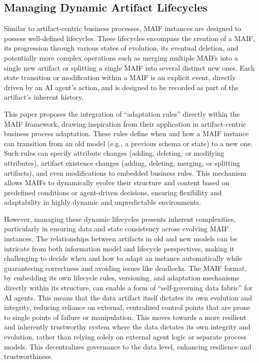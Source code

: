 \documentclass[conference]{IEEEtran}
\begin{document}
\subsection{Managing Dynamic Artifact Lifecycles}

Similar to artifact-centric business processes, MAIF instances are designed to possess well-defined lifecycles. These lifecycles encompass the creation of a MAIF, its progression through various states of evolution, its eventual deletion, and potentially more complex operations such as merging multiple MAIFs into a single new artifact or splitting a single MAIF into several distinct new ones\cite{ref12}. Each state transition or modification within a MAIF is an explicit event, directly driven by an AI agent's action, and is designed to be recorded as part of the artifact's inherent history.

This paper proposes the integration of ``adaptation rules'' directly within the MAIF framework, drawing inspiration from their application in artifact-centric business process adaptation\cite{ref12}. These rules define when and how a MAIF instance can transition from an old model (e.g., a previous schema or state) to a new one. Such rules can specify attribute changes (adding, deleting, or modifying attributes), artifact existence changes (adding, deleting, merging, or splitting artifacts), and even modifications to embedded business rules\cite{ref12}. This mechanism allows MAIFs to dynamically evolve their structure and content based on predefined conditions or agent-driven decisions, ensuring flexibility and adaptability in highly dynamic and unpredictable environments.

However, managing these dynamic lifecycles presents inherent complexities, particularly in ensuring data and state consistency across evolving MAIF instances\cite{ref12}. The relationships between artifacts in old and new models can be intricate from both information model and lifecycle perspectives, making it challenging to decide when and how to adapt an instance automatically while guaranteeing correctness and avoiding issues like deadlocks\cite{ref12}. The MAIF format, by embedding its own lifecycle rules, versioning, and adaptation mechanisms directly within its structure, can enable a form of ``self-governing data fabric'' for AI agents. This means that the data artifact itself dictates its own evolution and integrity, reducing reliance on external, centralized control points that are prone to single points of failure or manipulation. This moves towards a more resilient and inherently trustworthy system where the data dictates its own integrity and evolution, rather than relying solely on external agent logic or separate process models. This decentralizes governance to the data level, enhancing resilience and trustworthiness.
\end{document}
